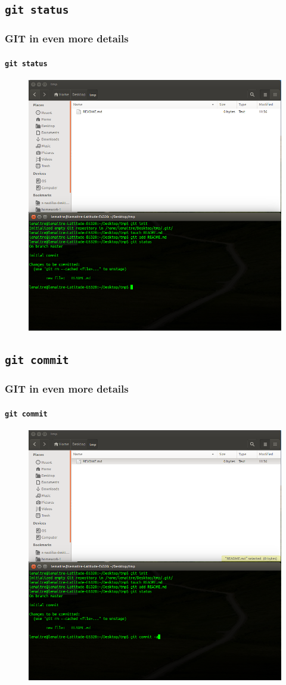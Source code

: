 \documentclass{beamer}
\begin{document}
\subsection{\texttt{git status}}

\begin{frame}
  \frametitle{GIT in even more details}
  \framesubtitle{\texttt{git status}}
  \begin{figure}
      \centering
      \includegraphics[width=.65\textwidth]{./images/workflow/status.png}
    \end{figure}
\end{frame}

\subsection{\texttt{git commit}}

\begin{frame}
  \frametitle{GIT in even more details}
  \framesubtitle{\texttt{git commit}}
  \begin{figure}
      \centering
      \includegraphics[width=.65\textwidth]{./images/workflow/commit.png}
    \end{figure}
\end{frame}
\end{document}

